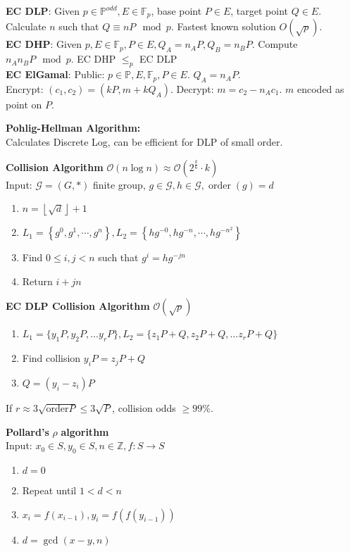 \documentclass[10pt]{article}
\DeclareMathOperator{\ord}{order}
\begin{document}
\newpage
\begin{multicols}{2}
    \noindent
    \textbf{EC DLP}: Given $p\in\mathbb{P}^{odd},E\in\mathbb{F}_p$, base point $P\in E$, target point $Q\in E$. Calculate $n$ such that $Q\equiv nP\mod{p}$.
    Fastest known solution $O(\sqrt{p}).$\\
    \textbf{EC DHP}: Given $p,E\in\mathbb{F}_p,P\in E,Q_A=n_AP,Q_B=n_BP$. Compute $n_An_BP\mod{p}$. EC DHP $\leq_p$ EC DLP\\
    \textbf{EC ElGamal}: Public: $p\in\mathbb{P},E,\mathbb{F}_p,P\in E$. $Q_A = n_A P$.\\
    Encrypt: $(c_1,c_2)=(kP,m+kQ_A)$. Decrypt: $m=c_2-n_Ac_1$. $m$ encoded as point on $P$.

    \noindent
    \textbf{Pohlig-Hellman Algorithm:}\\
    Calculates Discrete Log, can be efficient for DLP of small order.

    \noindent
    \textbf{Collision Algorithm} $\mathcal{O}(n\log{n})\approx\mathcal{O}(2^{\frac{k}{6}}\cdot k)$\\
    Input: $\mathcal{G}=(G,*)$ finite group, $g\in\mathcal{G},h\in\mathcal{G},\ord{(g)}=d$
    \begin{enumerate}
        \item $n=\left\lfloor\sqrt{d}\right\rfloor+1$
        \item $L_1=\left\{g^0,g^1,\cdots,g^n\right\},L_2=\left\{hg^{-0},hg^{-n},\cdots,hg^{-n^2}\right\}$
        \item Find $0\leq i,j<n$ such that $g^i=hg^{-jn}$
        \item Return $i+jn$
    \end{enumerate}

    \noindent
    \textbf{EC DLP Collision Algorithm} $\mathcal{O}(\sqrt p)$
    \begin{enumerate}
        \item $L_1 = \{y_1 P, y_2 P, \dots y_r P\}, L_2 = \{z_1 P + Q, z_2 P + Q, \dots z_r P + Q\}$
        \item Find collision $y_i P = z_jP+Q$
        \item $Q = (y_i - z_i)P$
    \end{enumerate}
    If $r \approx 3\sqrt{\text{order} P} \leq 3 \sqrt{P}$, collision odds $\geq 99\%$.

    \noindent
    \textbf{Pollard's} $\rho$ \textbf{algorithm}\\
    Input: $x_0\in S,y_0\in S,n\in\mathbb{Z},f:S\rightarrow S$
    \begin{enumerate}
        \item $d=0$
        \item Repeat until $1<d<n$
        \item $x_i=f(x_{i-1}),y_i=f(f(y_{i-1}))$
        \item $d=\gcd(x-y,n)$
    \end{enumerate}


\end{multicols}
\end{document}
